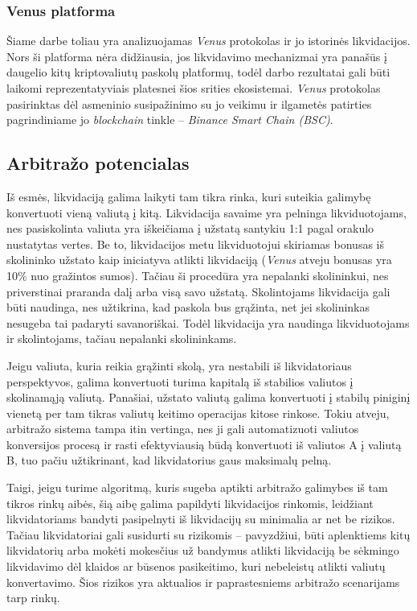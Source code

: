 \documentclass{VUMIFPSkursinis}
\begin{document}
\subsubsection{Venus platforma}

Šiame darbe toliau yra analizuojamas \textit{Venus} protokolas ir jo istorinės likvidacijos. Nors ši platforma nėra didžiausia, jos likvidavimo mechanizmai yra panašūs į daugelio kitų kriptovaliutų paskolų platformų, todėl darbo rezultatai gali būti laikomi reprezentatyviais platesnei šios srities ekosistemai. \textit{Venus} protokolas pasirinktas dėl asmeninio susipažinimo su jo veikimu ir ilgametės patirties pagrindiniame jo \textit{blockchain} tinkle – \textit{Binance Smart Chain (BSC)}.

\subsection{Arbitražo potencialas}

Iš esmės, likvidaciją galima laikyti tam tikra rinka, kuri suteikia galimybę konvertuoti vieną valiutą į kitą. Likvidacija savaime yra pelninga likviduotojams, nes pasiskolinta valiuta yra iškeičiama į užstatą santykiu 1:1 pagal orakulo nustatytas vertes. Be to, likvidacijos metu likviduotojui skiriamas bonusas iš skolininko užstato kaip iniciatyva atlikti likvidaciją (\textit{Venus} atveju bonusas yra 10\% nuo gražintos sumos). Tačiau ši procedūra yra nepalanki skolininkui, nes priverstinai praranda dalį arba visą savo užstatą. Skolintojams likvidacija gali būti naudinga, nes užtikrina, kad paskola bus grąžinta, net jei skolininkas nesugeba tai padaryti savanoriškai. Todėl likvidacija yra naudinga likviduotojams ir skolintojams, tačiau nepalanki skolininkams.

Jeigu valiuta, kuria reikia grąžinti skolą, yra nestabili iš likvidatoriaus perspektyvos, galima konvertuoti turima kapitalą iš stabilios valiutos į skolinamąją valiutą. Panašiai, užstato valiutą galima konvertuoti į stabilų piniginį vienetą per tam tikras valiutų keitimo operacijas kitose rinkose. Tokiu atveju, arbitražo sistema tampa itin vertinga, nes ji gali automatizuoti valiutos konversijos procesą ir rasti efektyviausią būdą konvertuoti iš valiutos A į valiutą B, tuo pačiu užtikrinant, kad likvidatorius gaus maksimalų pelną.

Taigi, jeigu turime algoritmą, kuris sugeba aptikti arbitražo galimybes iš tam tikros rinkų aibės, šią aibę galima papildyti likvidacijos rinkomis, leidžiant likvidatoriams bandyti pasipelnyti iš likvidacijų su minimalia ar net be rizikos. Tačiau likvidatoriai gali susidurti su rizikomis -- pavyzdžiui, būti aplenktiems kitų likvidatorių arba mokėti mokesčius už bandymus atlikti likvidaciją be sėkmingo likvidavimo dėl klaidos ar būsenos pasikeitimo, kuri nebeleistų atlikti valiutų konvertavimo. Šios rizikos yra aktualios ir paprastesniems arbitražo scenarijams tarp rinkų.
\end{document}
